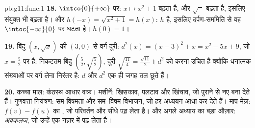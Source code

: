 \begin{solution}{pb:g11:func:1}
\textbf{18.} $\intco{0}{+\infty}$ पर: $x \mapsto x^2 + 1$ बढ़ता है, और $\sqrt{\phantom{x}}$ बढ़ता है, इसलिए संयुक्त 
भी बढ़ता है। और $h(-x) = \sqrt{x^2 + 1} = h(x)$: $h$  है, इसलिए दर्पण-सममिति से वह $\intoc{-\infty}{0}$ पर घटता
है।  $h(0) = 1$।

\textbf{19.} बिंदु $(x, \sqrt x)$ की $(3, 0)$ से वर्ग-दूरी: $d^2(x) = (x - 3)^2 + x = x^2 - 5x + 9$, जो $x = \frac52$ पर 
है: निकटतम बिंदु $\left(\frac52, \sqrt{\frac52}\right)$, दूरी $\sqrt{\frac{11}{4}} = \frac{\sqrt{11}}{2}$। $d^2$ को  करना उचित है क्योंकि
धनात्मक संख्याओं पर वर्ग लेना निरंतर  है: $d$ और $d^2$ एक ही जगह
तल छूते हैं।

\textbf{20.} कच्चा माल: कंठस्थ आधार वक्र। मशीनें: खिसकाव, पलटाव और खिंचाव,
जो पुराने  से नए बना देते हैं। गुणवत्ता-नियंत्रण: सम-विषमता और सम--विषम
विभाजन, जो हर अध्ययन आधा कर देते हैं। माप-मेज़: $f(v) - f(u)$ का , जो
परिवर्तन और  सीधे पढ़ लेता है। और अगले अध्याय का बड़ा औज़ार:
\emph{अवकलज}, जो उन्हें एक नज़र में पढ़ लेता है।
\end{solution}
